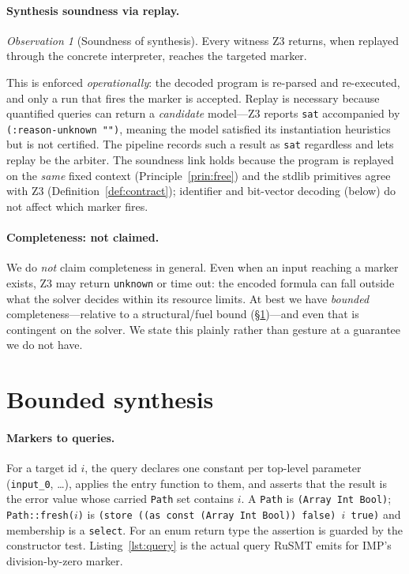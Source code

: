 \documentclass[11pt,a4paper]{article}
\theoremstyle{definition}
\theoremstyle{remark}
\newtheorem{observation}{Observation}
\newcommand{\rusmt}{RuSMT}
\newcommand{\imp}{IMP}
\newcommand{\code}[1]{\texttt{#1}}
\begin{document}
\paragraph{Synthesis soundness via replay.}
\begin{observation}[Soundness of synthesis]
Every witness Z3 returns, when replayed through the concrete interpreter, reaches
the targeted marker.
\end{observation}
This is enforced \emph{operationally}: the decoded program is re-parsed and
re-executed, and only a run that fires the marker is accepted. Replay is
necessary because quantified queries can return a \emph{candidate} model---Z3
reports \code{sat} accompanied by \code{(:reason-unknown "")}, meaning the model
satisfied its instantiation heuristics but is not certified. The pipeline records
such a result as \code{sat} regardless and lets replay be the arbiter. The
soundness link holds because the program is replayed on the \emph{same} fixed
context (Principle~\ref{prin:free}) and the stdlib primitives agree with Z3
(Definition~\ref{def:contract}); identifier and bit-vector decoding (below) do
not affect which marker fires.

\paragraph{Completeness: not claimed.}
We do \emph{not} claim completeness in general. Even when an input reaching a
marker exists, Z3 may return \code{unknown} or time out: the encoded formula can
fall outside what the solver decides within its resource limits. At best we have
\emph{bounded} completeness---relative to a structural/fuel bound
(\S\ref{sec:synthesis})---and even that is contingent on the solver. We state
this plainly rather than gesture at a guarantee we do not have.

\section{Bounded synthesis}
\label{sec:synthesis}

\paragraph{Markers to queries.}
For a target id $i$, the query declares one constant per top-level parameter
(\code{input\_0}, \dots), applies the entry function to them, and asserts that the
result is the error value whose carried \code{Path} set contains $i$. A
\code{Path} is \code{(Array Int Bool)}; \code{Path::fresh($i$)} is
\code{(store ((as const (Array Int Bool)) false) $i$ true)} and membership is a
\code{select}. For an enum return type the assertion is guarded by the
constructor test. Listing~\ref{lst:query} is the actual query \rusmt{} emits for
\imp{}'s division-by-zero marker.
\end{document}
